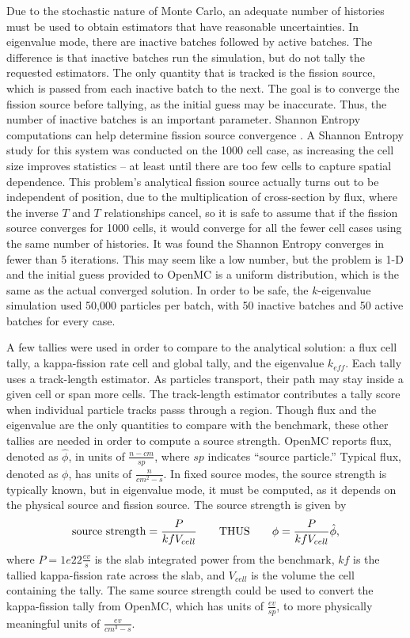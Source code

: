 \documentclass[letterpaper]{mc2023}
\begin{document}
Due to the stochastic nature of Monte Carlo, an adequate number of histories must be used to obtain estimators that have reasonable
uncertainties. In eigenvalue mode, there are inactive batches followed by active batches. The difference is that inactive batches run
the simulation, but do not tally the requested estimators. The only quantity that is tracked is the fission source, which is passed from
each inactive batch to the next. The goal is to converge the fission source before tallying, as the initial guess may be inaccurate.
Thus, the number of inactive batches is an important parameter. Shannon Entropy computations can help determine fission source convergence
\cite{brown-entropy-2006}. A Shannon Entropy study for this system was conducted on the 1000 cell case, as increasing the cell size
improves statistics -- at least until there are too few cells to capture spatial dependence. This problem's analytical fission source
actually turns out to be independent of position, due to the multiplication of cross-section by flux, where the inverse $T$ and $T$
relationships cancel, so it is safe to assume that if the fission source converges for 1000 cells, it would converge for all the fewer
cell cases using the same number of histories. It was found the Shannon Entropy converges in fewer than 5 iterations. This may seem
like a low number, but the problem is 1-D and the initial guess provided to OpenMC is a uniform distribution, which is the same as the
actual converged solution. In order to be safe, the $k$-eigenvalue simulation used 50,000 particles per batch, with 50 inactive batches
and 50 active batches for every case.

A few tallies were used in order to compare to the analytical solution: a flux cell tally, a kappa-fission rate cell and global tally,
and the eigenvalue $k_{eff}$. Each tally uses a track-length estimator. As particles transport, their path may stay inside a given cell
or span more cells. The track-length estimator contributes a tally score when individual particle tracks passs through a region. Though
flux and the eigenvalue are the only quantities to compare with the benchmark, these other tallies are needed in order to compute a
source strength. OpenMC reports flux, denoted as $\hat{\phi}$, in units of $\frac{n-cm}{sp}$, where $sp$ indicates ``source particle.''
Typical flux, denoted as $\phi$, has units of $\frac{n}{cm^2-s}$. In fixed source modes, the source strength is typically known, but in
eigenvalue mode, it must be computed, as it depends on the physical source and fission source. The source strength is given by
\begin{equation} \label{eq:source_strength}
   \text{source strength} = \frac{P}{kf V_{cell}} \qquad \text{THUS} \qquad \phi = \frac{P}{kf V_{cell} }\hat{\phi},
\end{equation}
where $P=1e22 \frac{ev}{s}$ is the slab integrated power from the benchmark, $kf$ is the tallied kappa-fission rate across the slab,
and $V_{cell}$ is the volume the cell containing the tally. The same source strength could be used to convert the kappa-fission tally from
OpenMC, which has units of $\frac{ev}{sp}$, to more physically meaningful units of $\frac{ev}{cm^3-s}$.
\end{document}
